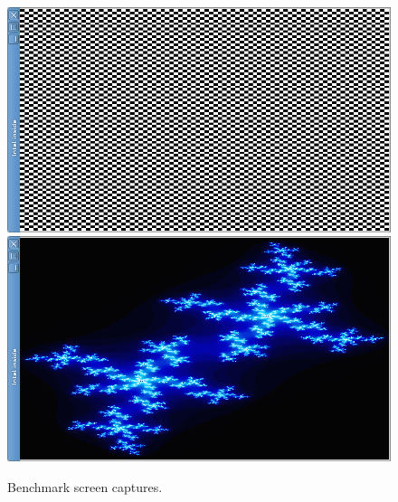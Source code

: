 \begin{figure}
  \minipage{\linewidth}
  \includegraphics[width=\linewidth]{img/imgchess.png}
  \endminipage\\[6pt]
  \minipage{\linewidth}
  \includegraphics[width=\linewidth]{img/imgjulia.png}
  \caption[Benchmark screen captures]{Benchmark screen captures.}
  \label{fig:benchmarks}
  \endminipage
\end{figure}

